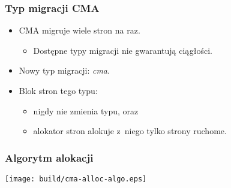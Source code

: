 \begin{frame}
  \frametitle{Typ migracji CMA}

  \begin{itemize}
  \item CMA migruje wiele stron na raz.
    \begin{itemize}
    \item Dostępne typy migracji nie gwarantują ciągłości.
    \end{itemize}
  \item Nowy typ migracji: \textit{cma}.
  \item Blok stron tego typu:
    \begin{itemize}
    \item nigdy nie zmienia typu, oraz
    \item alokator stron alokuje z~niego tylko strony ruchome.
    \end{itemize}
  \end{itemize}
\end{frame}

\begin{frame}
  \frametitle{Algorytm alokacji}

  \begin{center}
    \texttt{[image: build/cma-alloc-algo.eps]}
  \end{center}

\end{frame}
